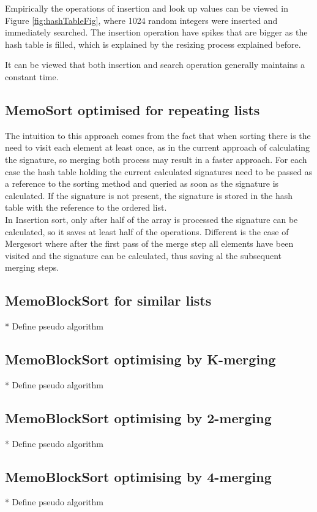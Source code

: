 \documentclass[a4paper,12pt]{article}
\begin{document}
Empirically the operations of insertion and look up values can be viewed in Figure \ref{fig:hashTableFig}, where 1024 random integers were inserted and immediately searched. The insertion operation have spikes that are bigger as the hash table is filled, which is explained by the resizing process explained before. 

It can be viewed that both insertion and search operation generally maintains a constant time.

\subsection{MemoSort optimised for repeating lists}
The intuition to this approach comes from the fact that when sorting there is the need to visit each element at least once, as in the current approach of calculating the signature, so merging both process may result in a faster approach.
For each case the hash table holding the current calculated signatures need to be passed as a reference to the sorting method and queried as soon as the signature is calculated. If the signature is not present, the signature is stored in the hash table with the reference to the ordered list. \\

In Insertion sort, only after half of the array is processed the signature can be calculated, so it saves at least half of the operations. Different is the case of Mergesort where after the first pass of the merge step all elements have been visited and the signature can be calculated, thus saving al the subsequent merging steps.

\subsection{MemoBlockSort for similar lists}
* Define pseudo algorithm

\subsection{MemoBlockSort optimising by K-merging}
* Define pseudo algorithm

\subsection{MemoBlockSort optimising by 2-merging}
* Define pseudo algorithm

\subsection{MemoBlockSort optimising by 4-merging}
* Define pseudo algorithm
\end{document}
